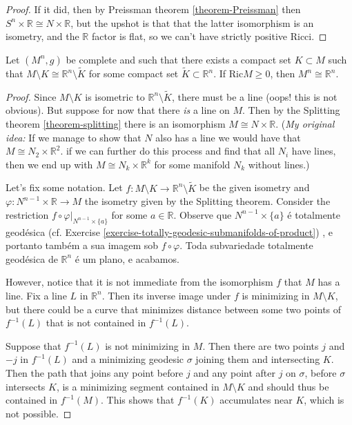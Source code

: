 \begin{proof}
If it did, then by Preissman theorem \ref{theorem-Preissman} then $S^n\times
\mathbb{R}\cong N \times \mathbb{R}$, but the upshot is that that the latter 
isomorphism is an isometry, and the $\mathbb{R}$ factor is flat, so we can't 
have strictly positive Ricci.
\end{proof}

\begin{exercise}
\label{exercise-complete-without-a-compact-set-isometric-to-Rn}
Let $(M^n,g)$ be complete and such that there exists a compact set
 $K\subset M$ such that $M\setminus K \cong \mathbb{R}^n \setminus \tilde{K}$
for some compact set $\tilde{K} \subset \mathbb{R}^n$. If $\text{Ric}M \geq 0$,
then $M^n \cong \mathbb{R}^n$.
\end{exercise}

\begin{proof}
Since $M\setminus K$ is isometric to $\mathbb{R}^n\setminus \tilde{K}$, there
must be a line (oops! this is not obvious). But suppose for now that there {\it
is} a line on $M$. Then by the Splitting theorem \ref{theorem-splitting} there 
is an isomorphism $M \cong N \times \mathbb{R}$. ({\it My original idea:}
 If we manage to show that $N$ also has a line we would have that
 $M \cong N_2 \times \mathbb{R}^2$.  if we can further do this process and find
 that all $N_i$ have lines,
then we end up with $M \cong N_k \times \mathbb{R}^k$ for some manifold $N_k$
without lines.)

Let's fix some notation. Let 
$f:M\setminus K \to \mathbb{R}^n \setminus\tilde{K}$ be the given isometry and
$\varphi:N^{n-1}\times\mathbb{R} \to M$ the isometry given by the Splitting
theorem. Consider the restriction $f \circ \varphi |_{ N^{n-1}\times \{ a\}}$
for some $a \in \mathbb{R}$. Observe que $N^{n-1}\times \{ a\}$ é totalmente
geodésica (cf. Exercise \ref{exercise-totally-geodesic-submanifolds-of-product})
, e portanto também a sua imagem sob  $f \circ \varphi$. Toda subvariedade
totalmente geodésica de $\mathbb{R}^n$ é um plano, e acabamos.

However, notice that it is not immediate from the
isomorphism $f$ that $M$ has a line. Fix a line $L$ in $\mathbb{R}^n$. Then its
inverse image under $f$ is minimizing in $M \setminus K$, but there could be a
curve that minimizes distance between some two points of $f^{-1}(L)$ that is not
contained in $f^{-1}(L)$.

Suppose that $f^{-1}(L)$ is not minimizing in $M$. Then there are two points $j$
and $-j$ in $f^{-1}(L)$ and a minimizing geodesic $\sigma$ joining them and
intersecting $K$. Then the path that joins any point before $j$ and any point
after $j$ on $\sigma$, before $\sigma$ intersects $K$, is a minimizing segment
contained in $M\setminus K$ and should thus be contained in $f^{-1}(M)$. This
shows that $f^{-1}(K)$ accumulates near $K$, which is not possible.
\end{proof}

